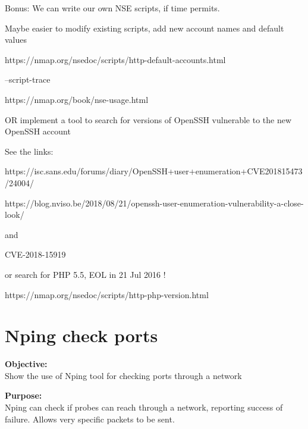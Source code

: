 \documentclass[a4paper,11pt,notitlepage]{report}
\begin{document}
Bonus: We can write our own NSE scripts, if time permits.

Maybe easier to modify existing scripts, add new account names and default values

https://nmap.org/nsedoc/scripts/http-default-accounts.html

--script-trace

https://nmap.org/book/nse-usage.html

OR implement a tool to search for versions of OpenSSH vulnerable to the new OpenSSH account

See the links:

https://isc.sans.edu/forums/diary/OpenSSH+user+enumeration+CVE201815473/24004/

https://blog.nviso.be/2018/08/21/openssh-user-enumeration-vulnerability-a-close-look/

and

CVE-2018-15919

or search for PHP 5.5, EOL in 21 Jul 2016 !

https://nmap.org/nsedoc/scripts/http-php-version.html



\chapter{Nping check ports}
\label{ex:nping-tcp}
{\bf Objective:} \\
Show the use of Nping tool for checking ports through a network

{\bf Purpose:}\\
Nping can check if probes can reach through a network, reporting success of failure. Allows very specific packets to be sent.
\end{document}
